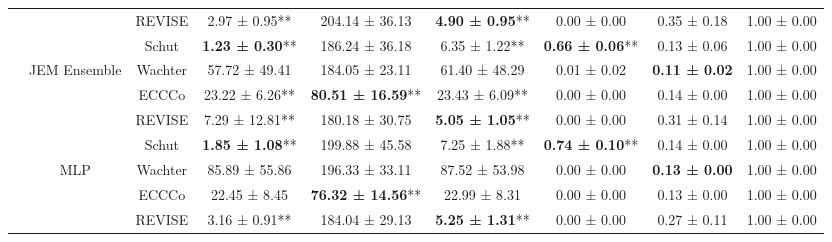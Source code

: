 \begin{table}
{\begin{tabular}[t]{ccccccccc}
 &  & REVISE & 2.97 ± 0.95** & 204.14 ± 36.13\hphantom{*}\hphantom{*} & \textbf{4.90 ± 0.95}** & 0.00 ± 0.00\hphantom{*}\hphantom{*} & 0.35 ± 0.18\hphantom{*}\hphantom{*} & 1.00 ± 0.00\hphantom{*}\hphantom{*}\\

 &  & Schut & \textbf{1.23 ± 0.30}** & 186.24 ± 36.18\hphantom{*}\hphantom{*} & 6.35 ± 1.22** & \textbf{0.66 ± 0.06}** & 0.13 ± 0.06\hphantom{*}\hphantom{*} & 1.00 ± 0.00\hphantom{*}\hphantom{*}\\

 & \multirow[t]{-4}{*}{\centering\arraybackslash JEM Ensemble} & Wachter & 57.72 ± 49.41\hphantom{*}\hphantom{*} & 184.05 ± 23.11\hphantom{*}\hphantom{*} & 61.40 ± 48.29\hphantom{*}\hphantom{*} & 0.01 ± 0.02\hphantom{*}\hphantom{*} & \textbf{0.11 ± 0.02}\hphantom{*}\hphantom{*} & 1.00 ± 0.00\hphantom{*}\hphantom{*}\\
\cmidrule{2-9}
 &  & ECCCo & 23.22 ± 6.26** & \textbf{80.51 ± 16.59}** & 23.43 ± 6.09** & 0.00 ± 0.00\hphantom{*}\hphantom{*} & 0.14 ± 0.00\hphantom{*}\hphantom{*} & 1.00 ± 0.00\hphantom{*}\hphantom{*}\\

 &  & REVISE & 7.29 ± 12.81** & 180.18 ± 30.75\hphantom{*}\hphantom{*} & \textbf{5.05 ± 1.05}** & 0.00 ± 0.00\hphantom{*}\hphantom{*} & 0.31 ± 0.14\hphantom{*}\hphantom{*} & 1.00 ± 0.00\hphantom{*}\hphantom{*}\\

 &  & Schut & \textbf{1.85 ± 1.08}** & 199.88 ± 45.58\hphantom{*}\hphantom{*} & 7.25 ± 1.88** & \textbf{0.74 ± 0.10}** & 0.14 ± 0.00\hphantom{*}\hphantom{*} & 1.00 ± 0.00\hphantom{*}\hphantom{*}\\

 & \multirow[t]{-4}{*}{\centering\arraybackslash MLP} & Wachter & 85.89 ± 55.86\hphantom{*}\hphantom{*} & 196.33 ± 33.11\hphantom{*}\hphantom{*} & 87.52 ± 53.98\hphantom{*}\hphantom{*} & 0.00 ± 0.00\hphantom{*}\hphantom{*} & \textbf{0.13 ± 0.00}\hphantom{*}\hphantom{*} & 1.00 ± 0.00\hphantom{*}\hphantom{*}\\
\cmidrule{2-9}
 &  & ECCCo & 22.45 ± 8.45\hphantom{*}\hphantom{*} & \textbf{76.32 ± 14.56}** & 22.99 ± 8.31\hphantom{*}\hphantom{*} & 0.00 ± 0.00\hphantom{*}\hphantom{*} & 0.13 ± 0.00\hphantom{*}\hphantom{*} & 1.00 ± 0.00\hphantom{*}\hphantom{*}\\

 &  & REVISE & 3.16 ± 0.91** & 184.04 ± 29.13\hphantom{*}\hphantom{*} & \textbf{5.25 ± 1.31}** & 0.00 ± 0.00\hphantom{*}\hphantom{*} & 0.27 ± 0.11\hphantom{*}\hphantom{*} & 1.00 ± 0.00\hphantom{*}\hphantom{*}\\


\end{tabular}}
\end{table}
